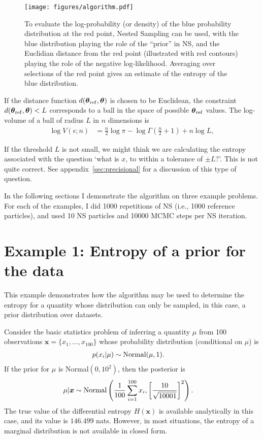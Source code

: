 \documentclass[entropy,article,accept,oneauthor,pdftex,10pt,a4paper]{mdpi}
\newcommand{\x}{\boldsymbol{\theta}}
\newcommand{\xref}{\x_{\rm ref}}
\begin{document}
\begin{figure}[!ht]
\centering
\texttt{[image: figures/algorithm.pdf]}
\caption{To evaluate the log-probability (or density) of the blue
probability distribution at the red point, Nested Sampling can be used,
with the blue distribution playing the role of the ``prior'' in NS, and the
Euclidian distance from the red point (illustrated with red contours)
playing the role of the negative log-likelihood. Averaging over selections
of the red point gives an estimate of the entropy of the blue distribution.
\label{fig:algorithm}}
\end{figure}

If the distance function $d(\xref, \x)$ is chosen to be Euclidean,
the constraint $d(\xref, \x) < L$ corresponds to a ball in the space
of possible $\xref$ values.
The log-volume of a ball of radius $L$ in $n$ dimensions is
\begin{align}
\log V(\epsilon; n) &= \frac{n}{2}\log \pi
                        - \log \Gamma\left(\frac{n}{2} + 1\right)
                        + n \log L,
\end{align}

If the threshold $L$ is not small, we might think we are calculating the entropy associated
with the question `what is $x$, to within a tolerance of $\pm L$?'.
This is not quite correct. See appendix~\ref{sec:precisional}
for a discussion of this
type of question.

In the following sections I demonstrate the algorithm on three
example problems. For each of the examples, I did 1000 repetitions of NS
(i.e., 1000 reference particles), and used 10 NS particles and 10000 MCMC
steps per NS iteration.

\section{Example 1: Entropy of a prior for the data}

This example demonstrates how the algorithm may be used to determine the
entropy for a quantity whose distribution can only be sampled, in this case,
a prior distribution over datasets.

Consider the basic statistics problem of inferring a quantity $\mu$ from
100 observations $\boldsymbol{x} = \{x_1, ..., x_{100}\}$ whose
probability distribution (conditional on $\mu$) is
\begin{align}
p(x_i | \mu) &\sim \textnormal{Normal}(\mu, 1).
\end{align}
If the prior for $\mu$ is Normal$(0, 10^2)$, then the posterior is
\begin{align}
\mu | \boldsymbol{x} &\sim \textnormal{Normal}\left(
                                       \frac{1}{100}\sum_{i=1}^{100} x_i,
                                       \left[\frac{10}{\sqrt{10001}}\right]^2
                                       \right).
\end{align}
The true value of the differential entropy $H(\boldsymbol{x})$ is
available analytically
in this case, and its value is $146.499$ nats. However, in most situations, the
entropy of a marginal distribution is not available in closed form. 
\end{document}
